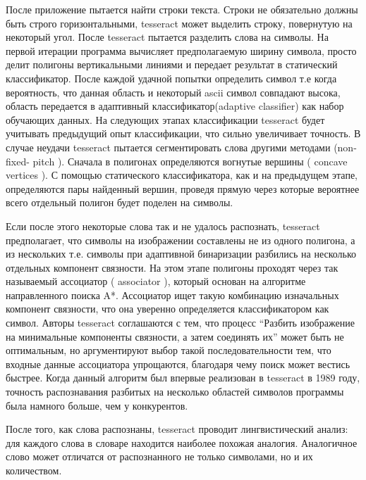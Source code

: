 \documentclass[oneside,final,14pt]{extreport}
\begin{document}
После приложение пытается найти строки текста. Строки не обязательно должны быть строго горизонтальными, tesseract может выделить строку, повернутую на некоторый угол. После tesseract пытается разделить слова на символы. На первой итерации программа вычисляет предполагаемую ширину символа, просто делит полигоны вертикальными линиями и передает результат в статический классификатор. После каждой удачной попытки определить символ т.е когда вероятность, что данная область и некоторый ascii символ совпадают высока, область передается в адаптивный классификатор(adaptive classifier)  как набор обучающих данных. На следующих этапах классификации tesseract будет учитывать предыдущий опыт классификации, что сильно увеличивает точность.  В случае неудачи tesseract пытается сегментировать слова другими методами (non-fixed-
pitch ). Сначала в полигонах определяются вогнутые вершины ( concave  vertices ). С помощью статического классификатора, как и на предыдущем этапе, определяются пары найденный вершин, проведя прямую через которые вероятнее всего отдельный полигон будет поделен на символы. 


Если после этого некоторые слова так и не удалось распознать, tesseract предполагает, что символы на изображении составлены не из одного полигона, а из нескольких т.е. символы при адаптивной бинаризации разбились на несколько отдельных компонент связности. На этом этапе полигоны проходят через так называемый ассоциатор ( associator ), который основан на алгоритме направленного поиска A*. Ассоциатор ищет такую комбинацию изначальных компонент связности, что она уверенно определяется классификатором как символ. Авторы tesseract соглашаются с тем, что процесс “Разбить изображение на минимальные компоненты связности, а затем соединять их” может быть не оптимальным, но аргументируют выбор такой последовательности тем, что входные данные ассоциатора упрощаются, благодаря чему поиск может вестись быстрее. Когда данный алгоритм был впервые реализован в tesseract в 1989 году, точность распознавания разбитых на несколько областей символов программы была намного больше, чем у конкурентов.

После того, как слова распознаны, tesseract проводит лингвистический анализ: для каждого слова в словаре находится наиболее похожая аналогия. Аналогичное слово может отличатся от распознанного не только символами, но и их количеством.
\end{document}

